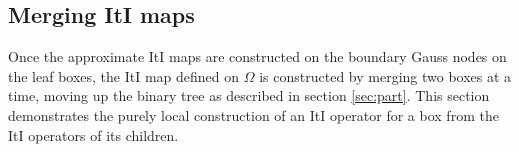 \documentclass[11pt,final]{amsart}
\theoremstyle{definition}
\numberwithin{remark}{section}
\numberwithin{definition}{section}
\numberwithin{pro}{section}
\begin{document}
\subsection{Merging ItI maps}
\label{sec:merge}
Once the approximate ItI maps are constructed
on the boundary Gauss nodes on the leaf boxes, the ItI map defined on $\Omega$
is constructed by merging two boxes at a time,
moving up the binary tree as described in section
\ref{sec:part}.
This section demonstrates the purely local construction
of an ItI operator for a box from the ItI operators of
its children.

\end{document}
